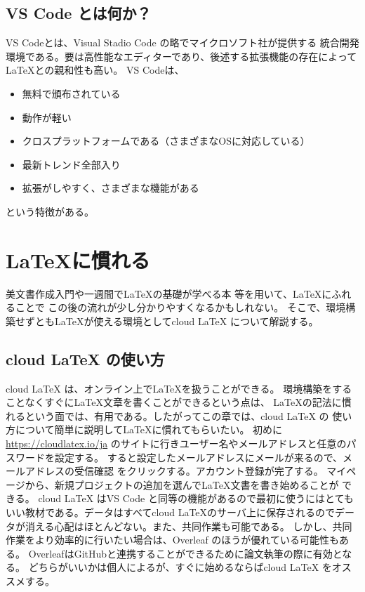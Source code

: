\documentclass{ltjsarticle}
\begin{document}
\subsection{VS Code とは何か？}
VS Codeとは、Visual Stadio Code の略でマイクロソフト社が提供する
統合開発環境である。要は高性能なエディターであり、後述する拡張機能の存在によって\LaTeX との親和性も高い。
VS Codeは、
\begin{itemize}
  \item 無料で頒布されている
  \item 動作が軽い
  \item クロスプラットフォームである（さまざまなOSに対応している）
  \item 最新トレンド全部入り
  \item 拡張がしやすく、さまざまな機能がある
\end{itemize}
という特徴がある。

\section{\LaTeX に慣れる}
美文書作成入門\cite{美文書本}や一週間で\LaTeX の基礎が学べる本
\cite{一週間基礎}等を用いて、\LaTeX にふれることで
この後の流れが少し分かりやすくなるかもしれない。
そこで、環境構築せずとも\LaTeX が使える環境としてcloud LaTeX 
について解説する。

\subsection{cloud LaTeX の使い方}
cloud LaTeX は、オンライン上で\LaTeX を扱うことができる。
環境構築をすることなくすぐに\LaTeX 文章を書くことができるという点は、
\LaTeX の記法に慣れるという面では、有用である。したがってこの章では、cloud LaTeX の
使い方について簡単に説明して\LaTeX に慣れてもらいたい。
初めに
\url{https://cloudlatex.io/ja}
のサイトに行きユーザー名やメールアドレスと任意のパスワードを設定する。
すると設定したメールアドレスにメールが来るので、メールアドレスの受信確認
をクリックする。アカウント登録が完了する。
マイページから、新規プロジェクトの追加を選んで\LaTeX 文書を書き始めることが
できる。
cloud LaTeX はVS Code と同等の機能があるので最初に使うにはとてもいい教材である。データはすべてcloud LaTeXのサーバ上に保存されるのでデータが消える心配はほとんどない。また、共同作業も可能である。
しかし、共同作業をより効率的に行いたい場合は、Overleaf のほうが優れている可能性もある。
OverleafはGitHubと連携することができるために論文執筆の際に有効となる。
どちらがいいかは個人によるが、すぐに始めるならばcloud LaTeX をオススメする。
\end{document}
